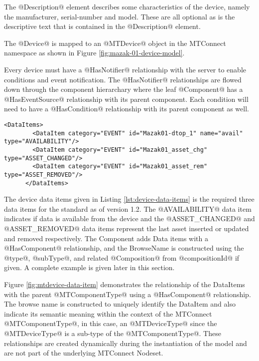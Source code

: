 The @Description@ element describes some characteristics of the device, namely the manufacturer, serial-number and model. These are all optional as is the descriptive text that is contained in the @Description@ element.

The @Device@ is mapped to an @MTDevice@ object in the MTConnect namespace as shown in Figure \ref{fig:mazak-01-device-model}.



Every device must have a @HasNotifier@ relationship with the server to enable conditions and event notification. The @HasNotifier@ relationships are flowed down through the component hierarchary where the leaf @Component@ has a @HasEventSource@ relationship with its parent component. Each condition will need to have a @HasCondition@ relationship with its parent component as well. 

\begin{lstlisting}[firstnumber=last,%
    caption={Device Data Items},label={lst:device-data-items}]
      <DataItems>
        <DataItem category="EVENT" id="Mazak01-dtop_1" name="avail" type="AVAILABILITY"/>
        <DataItem category="EVENT" id="Mazak01_asset_chg" type="ASSET_CHANGED"/>
        <DataItem category="EVENT" id="Mazak01_asset_rem" type="ASSET_REMOVED"/>
      </DataItems>
\end{lstlisting}

The device data items given in Listing \ref{lst:device-data-items} is the required three data items for the standard as of version 1.2. The @AVAILABILITY@ data item indicates if data is available from the device and the @ASSET_CHANGED@ and @ASSET_REMOVED@ data items represent the last asset inserted or updated and removed respectively. The Component adds Data items with a @HasComponent@ relationship, and the BrowseName is constructed using the @type@, @subType@, and related @Composition@ from @compositionId@ if given. A complete example is given later in this section.



Figure \ref{fig:mtdevice-data-item} demonstrates the relationship of the DataItems with the parent @MTComponentType@ using a @HasComponent@ relationship. The browse name is constructed to uniquely identify the DataItem and also indicate its semantic meaning within the context of the MTConnect @MTComponentType@, in this case, an @MTDeviceType@ since the @MTDeviceType@ is a sub-type of the @MTComponentType@. These relationships are created dynamically during the instantiation of the model and are not part of the underlying MTConnect Nodeset.

